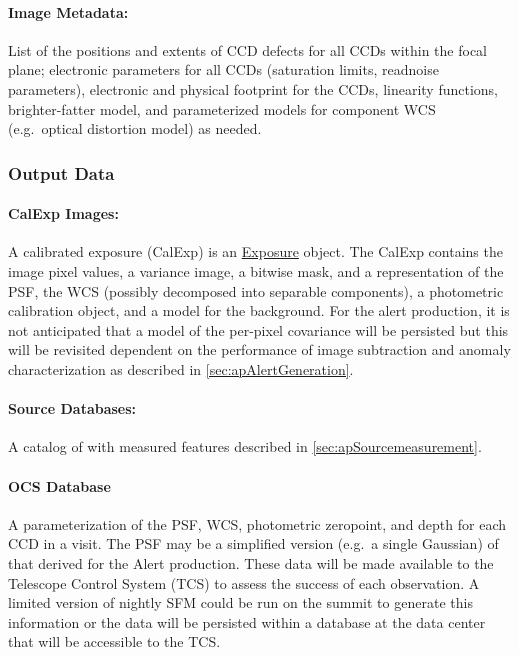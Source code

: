 \paragraph*{Image Metadata:} List of the positions and extents of CCD defects for all CCDs within the focal plane; electronic parameters for all CCDs (saturation limits, readnoise parameters), electronic and physical footprint for the CCDs, linearity functions, brighter-fatter model, and parameterized models for component WCS (e.g.\ optical distortion model) as needed.

\subsubsection{Output Data}
\label{sec:apSFMoutput}

\paragraph*{CalExp Images:} A calibrated exposure (CalExp) is an \hyperref[sec:spImagesExposure]{Exposure} object. The CalExp contains the image pixel values, a variance image, a bitwise mask, and a representation of the PSF, the WCS (possibly decomposed into separable components), a photometric calibration object, and a model for the  background. For the alert production, it is not anticipated that a model of the per-pixel covariance will be persisted but this will be revisited dependent on the performance of image subtraction and anomaly characterization as described in \ref{sec:apAlertGeneration}.

\paragraph*{Source Databases:} A catalog of \Sources with measured features described in \ref{sec:apSourcemeasurement}. 

\paragraph*{OCS Database} A parameterization of the PSF, WCS, photometric zeropoint, and depth for each CCD in a visit. The PSF may be a simplified version (e.g.\ a single Gaussian) of that derived for the Alert production. These data will be made available to the Telescope Control System (TCS) to assess the success of each observation. A limited version of nightly SFM could be run on the summit to generate this information or the  data will be persisted within a database at the data center that will be accessible to the TCS.


